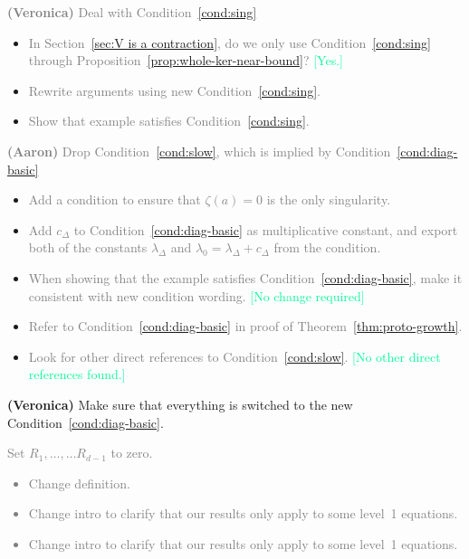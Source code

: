 \documentclass{article}
\theoremstyle{plain}
\newenvironment{brainstorm}{\color{violet}\begin{itemize}}{\end{itemize}\color{black}}
\begin{document}
\begin{brainstorm}
\item \textcolor{gray}{\textbf{(Veronica)} Deal with Condition~\eqref{cond:sing}}
\begin{itemize}
\item \textcolor{gray}{In Section~\ref{sec:V is a contraction}, do we only use Condition~\eqref{cond:sing} through Proposition~\ref{prop:whole-ker-near-bound}?} \textcolor{MediumSpringGreen}{[Yes.]}
\item \textcolor{gray}{Rewrite arguments using new Condition~\eqref{cond:sing}.}
\item \textcolor{gray}{Show that example satisfies Condition~\eqref{cond:sing}.}
\end{itemize}
\item \textcolor{gray}{\textbf{(Aaron)} Drop Condition~\eqref{cond:slow}, which is implied by Condition~\eqref{cond:diag-basic}}
\begin{itemize}
  \item \textcolor{gray}{Add a condition to ensure that $\zeta(a) = 0$ is the only singularity.}
  \item \textcolor{gray}{Add $c_\Delta$ to Condition~\eqref{cond:diag-basic} as multiplicative constant, and export both of the constants $\lambda_\Delta$ and $\lambda_0 = \lambda_\Delta + c_\Delta$ from the condition.}
  \item \textcolor{gray}{When showing that the example satisfies Condition~\eqref{cond:diag-basic}, make it consistent with new condition wording.} \textcolor{MediumSpringGreen}{[No change required]}
  \item \textcolor{gray}{Refer to Condition~\eqref{cond:diag-basic} in proof of Theorem~\ref{thm:proto-growth}.}
  \item \textcolor{gray}{Look for other direct references to Condition~\eqref{cond:slow}.} \textcolor{MediumSpringGreen}{[No other direct references found.]}
\end{itemize}
\item \textbf{(Veronica)} Make sure that everything is switched to the new Condition~\eqref{cond:diag-basic}.
\textcolor{gray}{
\item Set $R_1, \ldots, \ldots R_{d-1}$ to zero.
\begin{itemize}
\item Change definition.
\item Change intro to clarify that our results only apply to some level~1 equations.
\item Change intro to clarify that our results only apply to some level~1 equations.

\end{itemize}}
\end{brainstorm}
\end{document}
